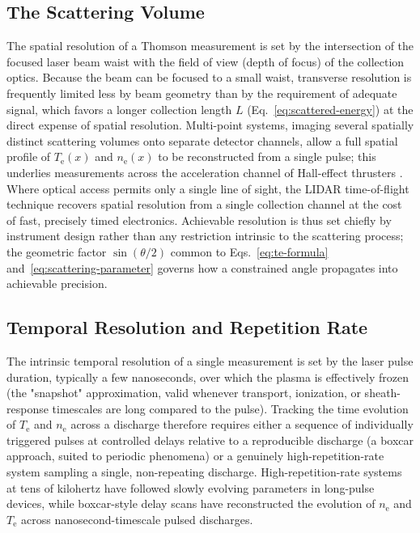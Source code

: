 \subsection{The Scattering Volume}

The spatial resolution of a Thomson measurement is set by the intersection of the focused laser beam waist with the field of view (depth of focus) of the collection optics. Because the beam can be focused to a small waist, transverse resolution is frequently limited less by beam geometry than by the requirement of adequate signal, which favors a longer collection length $L$ (Eq.~\eqref{eq:scattered-energy}) at the direct expense of spatial resolution. Multi-point systems, imaging several spatially distinct scattering volumes onto separate detector channels, allow a full spatial profile of $T_{\mathrm{e}}(x)$ and $n_{\mathrm{e}}(x)$ to be reconstructed from a single pulse; this underlies measurements across the acceleration channel of Hall-effect thrusters \cite{ref0356,ref0355}. Where optical access permits only a single line of sight, the LIDAR time-of-flight technique recovers spatial resolution from a single collection channel at the cost of fast, precisely timed electronics. Achievable resolution is thus set chiefly by instrument design rather than any restriction intrinsic to the scattering process; the geometric factor $\sin(\theta/2)$ common to Eqs.~\eqref{eq:te-formula} and~\eqref{eq:scattering-parameter} governs how a constrained angle propagates into achievable precision.

\subsection{Temporal Resolution and Repetition Rate}

The intrinsic temporal resolution of a single measurement is set by the laser pulse duration, typically a few nanoseconds, over which the plasma is effectively frozen (the "snapshot" approximation, valid whenever transport, ionization, or sheath-response timescales are long compared to the pulse). Tracking the time evolution of $T_{\mathrm{e}}$ and $n_{\mathrm{e}}$ across a discharge therefore requires either a sequence of individually triggered pulses at controlled delays relative to a reproducible discharge (a boxcar approach, suited to periodic phenomena) or a genuinely high-repetition-rate system sampling a single, non-repeating discharge. High-repetition-rate systems at tens of kilohertz have followed slowly evolving parameters in long-pulse devices, while boxcar-style delay scans have reconstructed the evolution of $n_{\mathrm{e}}$ and $T_{\mathrm{e}}$ across nanosecond-timescale pulsed discharges.

